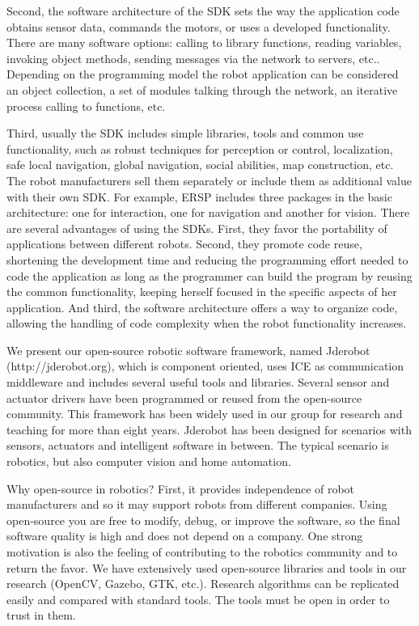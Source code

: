 \documentclass[twocolumn]{svjour3}          %
\begin{document}
Second, the software architecture of the SDK sets the way the application code obtains sensor data, commands the motors, or uses a developed functionality. There are many software options: calling to library functions, reading variables, invoking object methods, sending messages via the network to servers, etc.. Depending on the programming model the robot application can be considered an object collection, a set of modules talking through the network, an iterative process calling to functions, etc.

Third, usually the SDK includes simple libraries, tools and common use functionality, such as robust techniques for perception or control, localization, safe local navigation, global navigation, social abilities, map construction, etc. The robot manufacturers sell them separately or include them as additional value with their own SDK. For example, ERSP includes three packages in the basic architecture: one for interaction, one for navigation and another for vision. There are several advantages of using the SDKs. First, they favor the portability of applications between different robots. Second, they promote code reuse, shortening the development time and reducing the programming effort needed to code the application as long as the programmer can build the program by reusing the common functionality, keeping herself focused in the specific aspects of her application. And third, the software architecture offers a way to organize code, allowing the handling of code complexity when the robot functionality increases.

We present our open-source robotic software framework, named Jderobot (http://jderobot.org), which is component oriented, uses ICE as communication middleware and includes several useful tools and libraries. Several sensor and actuator drivers have been programmed or reused from the open-source community. This framework has been widely used in our group for research and teaching for more than eight years. Jderobot has been designed for scenarios with sensors, actuators and intelligent software in between. The typical scenario is robotics, but also computer vision and home automation.

Why open-source in robotics? First, it provides independence of robot manufacturers and so it may support robots from different companies. Using open-source you are free to modify, debug, or improve the software, so the final software quality is high and does not depend on a company. One strong motivation is also the feeling of contributing to the robotics community and to return the favor. We have extensively used open-source libraries and tools in our research (OpenCV, Gazebo, GTK, etc.). Research algorithms can be replicated easily and compared with standard tools. The tools must be open in order to trust in them.
\end{document}

